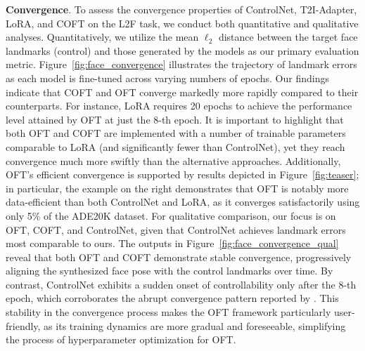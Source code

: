 \textbf{Convergence}. To assess the convergence properties of ControlNet, T2I-Adapter, LoRA, and COFT on the L2F task, we conduct both quantitative and qualitative analyses. Quantitatively, we utilize the mean $\ell_2$ distance between the target face landmarks (control) and those generated by the models as our primary evaluation metric. Figure~\ref{fig:face_convergence} illustrates the trajectory of landmark errors as each model is fine-tuned across varying numbers of epochs. Our findings indicate that COFT and OFT converge markedly more rapidly compared to their counterparts. For instance, LoRA requires 20 epochs to achieve the performance level attained by OFT at just the 8-th epoch. It is important to highlight that both OFT and COFT are implemented with a number of trainable parameters comparable to LoRA (and significantly fewer than ControlNet), yet they reach convergence much more swiftly than the alternative approaches. Additionally, OFT's efficient convergence is supported by results depicted in Figure~\ref{fig:teaser}; in particular, the example on the right demonstrates that OFT is notably more data-efficient than both ControlNet and LoRA, as it converges satisfactorily using only 5\% of the ADE20K dataset. For qualitative comparison, our focus is on OFT, COFT, and ControlNet, given that ControlNet achieves landmark errors most comparable to ours. The outputs in Figure~\ref{fig:face_convergence_qual} reveal that both OFT and COFT demonstrate stable convergence, progressively aligning the synthesized face pose with the control landmarks over time. By contrast, ControlNet exhibits a sudden onset of controllability only after the 8-th epoch, which corroborates the abrupt convergence pattern reported by \cite{zhang2023adding}. This stability in the convergence process makes the OFT framework particularly user-friendly, as its training dynamics are more gradual and foreseeable, simplifying the process of hyperparameter optimization for OFT.

